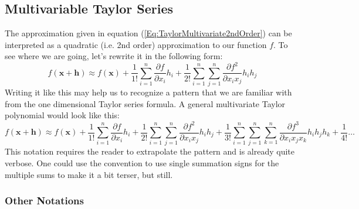 
\subsection{Multivariable Taylor Series} 
The approximation given in equation (\ref{Eq:TaylorMultivariate2ndOrder}) can be interpreted as a quadratic (i.e. 2nd order) approximation to our function $f$. To see where we are going, let's rewrite it in the following form:
\begin{equation}
 f(\mathbf{x + h}) \approx
 f(\mathbf{x}) + 
 \frac{1}{1!} \sum_{i=1}^{n} \frac{\partial f}{\partial x_i} h_i + 
 \frac{1}{2!} \sum_{i=1}^{n} \sum_{j=1}^{n}  \frac{\partial f^2}{\partial x_i x_j} h_i h_j
\end{equation}
Writing it like this may help us to recognize a pattern that we are familiar with from the one dimensional Taylor series formula. A general multivariate Taylor polynomial would look like this:
\begin{equation}
\label{Eq:TaylorSeriesMultiDim}
 f(\mathbf{x + h}) \approx
 f(\mathbf{x}) + 
 \frac{1}{1!} \sum_{i=1}^{n} 
              \frac{\partial f} {\partial x_i} h_i + 
 \frac{1}{2!} \sum_{i=1}^{n} \sum_{j=1}^{n}  
              \frac{\partial f^2}{\partial x_i x_j} h_i h_j +
 \frac{1}{3!} \sum_{i=1}^{n} \sum_{j=1}^{n}  \sum_{k=1}^{n} 
              \frac{\partial f^3}{\partial x_i x_j x_k} h_i h_j h_k + 
 \frac{1}{4!}  \ldots              
\end{equation}
This notation requires the reader to extrapolate the pattern and is already quite verbose. One could use the convention to use single summation signs for the multiple sums to make it a bit terser, but still.


\subsubsection{Other Notations}


